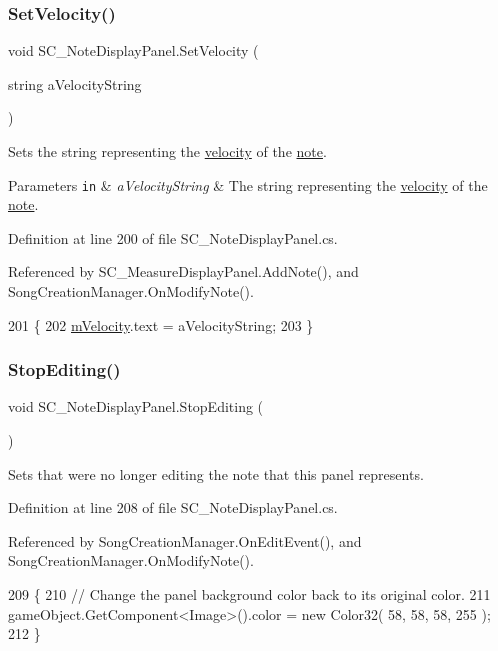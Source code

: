 \subsubsection{\texorpdfstring{Set\+Velocity()}{SetVelocity()}}
{\footnotesize\ttfamily void S\+C\+\_\+\+Note\+Display\+Panel.\+Set\+Velocity (\begin{DoxyParamCaption}\item[{string}]{a\+Velocity\+String }\end{DoxyParamCaption})}

Sets the string representing the \hyperlink{group___audio_DefVel}{velocity} of the \hyperlink{group___music_structs_struct_music_1_1_combined_note}{note}. 
\begin{DoxyParams}[1]{Parameters}
\mbox{\tt in}  & {\em a\+Velocity\+String} & The string representing the \hyperlink{group___audio_DefVel}{velocity} of the \hyperlink{group___music_structs_struct_music_1_1_combined_note}{note}. \\
\hline
\end{DoxyParams}


Definition at line 200 of file S\+C\+\_\+\+Note\+Display\+Panel.\+cs.



Referenced by S\+C\+\_\+\+Measure\+Display\+Panel.\+Add\+Note(), and Song\+Creation\+Manager.\+On\+Modify\+Note().


\begin{DoxyCode}
201     \{
202         \hyperlink{group___s_c___n_d_p_priv_var_ga4924aa3f63f171ed33f5f85d11a760c4}{mVelocity}.text = aVelocityString;
203     \}
\end{DoxyCode}
\mbox{\label{group___s_c___n_d_p_unity_ga92d0f078c4efd6c207173a10e31b5065}} 
\subsubsection{\texorpdfstring{Stop\+Editing()}{StopEditing()}}
{\footnotesize\ttfamily void S\+C\+\_\+\+Note\+Display\+Panel.\+Stop\+Editing (\begin{DoxyParamCaption}{ }\end{DoxyParamCaption})}



Sets that we\textquotesingle{}re no longer editing the note that this panel represents. 



Definition at line 208 of file S\+C\+\_\+\+Note\+Display\+Panel.\+cs.



Referenced by Song\+Creation\+Manager.\+On\+Edit\+Event(), and Song\+Creation\+Manager.\+On\+Modify\+Note().


\begin{DoxyCode}
209     \{
210         \textcolor{comment}{// Change the panel background color back to its original color.}
211         gameObject.GetComponent<Image>().color = \textcolor{keyword}{new} Color32( 58, 58, 58, 255 );
212     \}
\end{DoxyCode}

